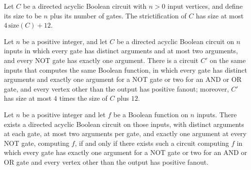 \begin{theorem}
\label{BoolCircuit.DAGCircuit.strictify_size_le}
\leanok
{}
Let $C$ be a directed acyclic Boolean circuit with $n>0$ input vertices, and define its
size to be $n$ plus its number of gates. The strictification of $C$ has size at most
$4\,\mathrm{size}(C)+12$.
\end{theorem}

\begin{theorem}
\label{BoolCircuit.DAGCircuit.exists_isStrict}
\leanok
{}
Let $n$ be a positive integer, and let $C$ be a directed acyclic Boolean circuit on $n$
inputs in which every gate has distinct arguments and at most two arguments, and every
NOT gate has exactly one argument. There is a circuit $C'$ on the same inputs that
computes the same Boolean function, in which every gate has distinct arguments and
exactly one argument for a NOT gate or two for an AND or OR gate, and every vertex other
than the output has positive fanout; moreover, $C'$ has size at most $4$ times the size
of $C$ plus $12$.
\end{theorem}

\begin{theorem}
\label{BoolCircuit.DAGCircuit.exists_isStrict_iff}
\leanok
{}
Let $n$ be a positive integer and let $f$ be a Boolean function on $n$ inputs. There
exists a directed acyclic Boolean circuit on those inputs, with distinct arguments at
each gate, at most two arguments per gate, and exactly one argument at every NOT gate,
computing $f$, if and only if there exists such a circuit computing $f$ in which every
gate has exactly one argument for a NOT gate or two for an AND or OR gate and every
vertex other than the output has positive fanout.
\end{theorem}

